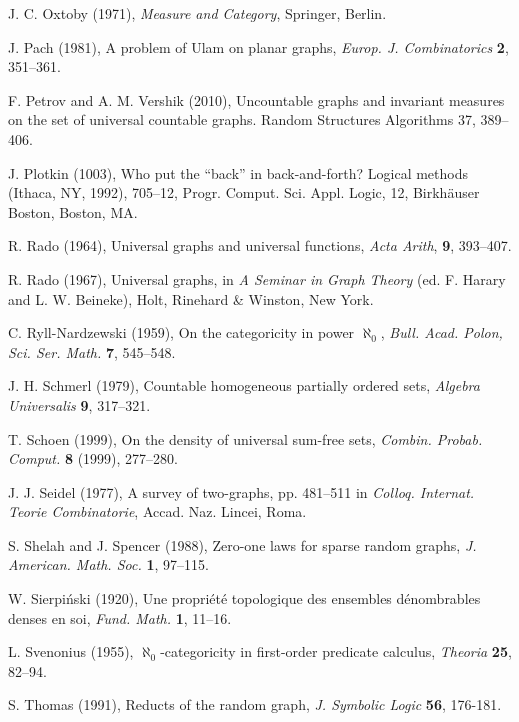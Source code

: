 \documentclass{book}
\begin{document}
\begin{thebibliography}{99}
J. C. Oxtoby (1971),
\textit{Measure and Category},
Springer, Berlin.

J. Pach (1981),
A problem of Ulam on planar graphs,
\textit{Europ. J. Combinatorics} \textbf{2}, 351--361.

F. Petrov and A. M. Vershik (2010),
Uncountable graphs and invariant measures on the set of universal
countable graphs.
Random Structures Algorithms 37, 389--406.

J. Plotkin (1003),
Who put the ``back'' in back-and-forth?
Logical methods (Ithaca, NY, 1992), 705--12,
Progr. Comput. Sci. Appl. Logic, 12, Birkhäuser Boston, Boston, MA.

R. Rado (1964),
Universal graphs and universal functions,
\textit{Acta Arith}, \textbf{9}, 393--407.

R. Rado (1967),
Universal graphs,
in \textit{A Seminar in Graph Theory} (ed. F. Harary and L. W. Beineke),
Holt, Rinehard \& Winston, New York.

C. Ryll-Nardzewski (1959),
On the categoricity in power $\aleph_0$,
\textit{Bull. Acad. Polon, Sci. Ser. Math.} \textbf{7}, 545--548.

J. H. Schmerl (1979),
Countable homogeneous partially ordered sets,
\textit{Algebra Universalis} \textbf{9}, 317--321.

T. Schoen (1999),
On the density of universal sum-free sets,
\textit{Combin. Probab. Comput.} \textbf{8} (1999), 277--280.

J. J. Seidel (1977),
A survey of two-graphs,
pp. 481--511 in  \textit{Colloq. Internat. Teorie Combinatorie},
Accad. Naz. Lincei, Roma.

S. Shelah and J. Spencer (1988),
Zero-one laws for sparse random graphs,
\textit{J. American. Math. Soc.} \textbf{1}, 97--115.

W. Sierpi\'{n}ski (1920),
Une propri\'{e}t\'{e} topologique des ensembles d\'{e}nombrables denses en soi, 
\textit{Fund. Math.} \textbf{1}, 11--16.

L. Svenonius (1955),
$\aleph_0$-categoricity in first-order predicate calculus,
\textit{Theoria} \textbf{25}, 82--94.

S. Thomas (1991),
Reducts of the random graph,
\textit{J. Symbolic Logic} \textbf{56}, 176-181.


\end{thebibliography}
\end{document}
